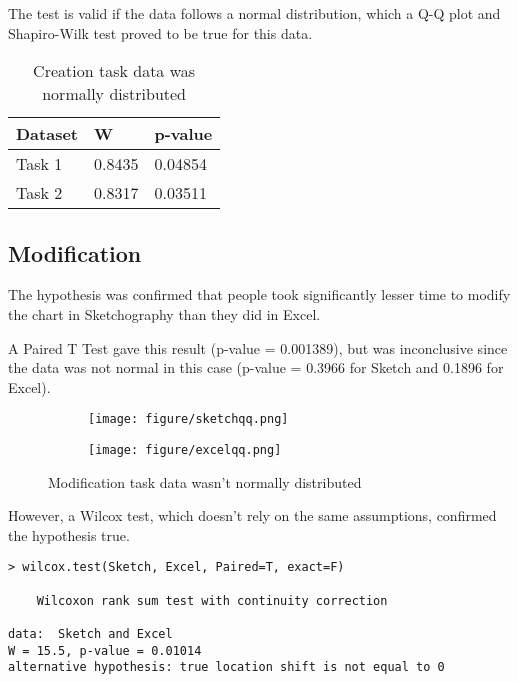 The test is valid if the data follows a normal distribution, which a Q-Q plot and Shapiro-Wilk test proved to be true for this data.

\begin{table}[H]
\begin{center}
\setlength{\tabcolsep}{8pt} 
\renewcommand{\arraystretch}{1.5}


\begin{tabular}{l | l l}
Dataset & W & p-value \\ \hline
Task 1 & 0.8435 & 0.04854 \\
Task 2 & 0.8317 & 0.03511 \\
\end{tabular}
\end{center}
\caption{Creation task data was normally distributed}
\end{table}


\subsection{Modification}
The hypothesis was confirmed that people took significantly lesser time to modify the chart in Sketchography than they did in Excel.

A Paired T Test gave this result (p-value = 0.001389), but was inconclusive since the data was not normal in this case (p-value = 0.3966 for Sketch and 0.1896 for Excel). 

\begin{figure}[H]
		\centering
		\begin{subfigure}[b]{0.4\textwidth}
			\texttt{[image: figure/sketchqq.png]}
		\end{subfigure}
		\begin{subfigure}[b]{0.4\textwidth}
			\texttt{[image: figure/excelqq.png]}
		\end{subfigure}
		\caption{Modification task data wasn't normally distributed}
	\end{figure}

However, a Wilcox test, which doesn't rely on the same assumptions, confirmed the hypothesis true.
\begin{verbatim}
> wilcox.test(Sketch, Excel, Paired=T, exact=F)

	Wilcoxon rank sum test with continuity correction

data:  Sketch and Excel
W = 15.5, p-value = 0.01014
alternative hypothesis: true location shift is not equal to 0
\end{verbatim}

